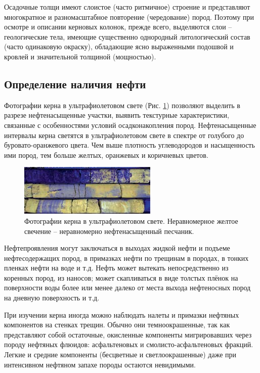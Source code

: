 \documentclass[14pt]{matmex-diploma}
\begin{document}
        Осадочные толщи имеют слоистое (часто ритмичное) строение и представляют многократное и разномасштабное повторение (чередование) пород. Поэтому при осмотре и описании керновых колонок, прежде всего, выделяются слои – геологические тела, имеющие существенно однородный литологический состав (часто одинаковую окраску), обладающие ясно выраженными подошвой и кровлей и значительной толщиной (мощностью).
        
    \subsection*{Определение наличия нефти}
    
        Фотографии керна в ультрафиолетовом свете (Рис. \ref{UV}) позволяют выделить в разрезе нефтенасыщенные участки, выявить текстурные характеристики, связанные с особенностями условий осадконакопления пород. Нефтенасыщенные интервалы керна светятся в ультрафиолетовом свете в спектре от голубого до буровато-оранжевого цвета. Чем выше плотность углеводородов и насыщенность ими пород, тем больше желтых, оранжевых и коричневых цветов. \cite{paper:kern}
        
        \begin{figure}[h]
            \centering
            \includegraphics[scale=1]{images/UV.png}
            \caption{Фотографии керна в ультрафиолетовом свете. Неравномерное желтое свечение – неравномерно нефтенасыщенный песчаник.}
            \label{UV}
        \end{figure}        
        
        Нефтепроявления могут заключаться в выходах жидкой нефти и подъеме нефтесодержащих пород, в примазках нефти по трещинам в породах, в тонких пленках нефти на воде и т.д. Нефть может вытекать непосредственно из коренных пород, из наносов; может скапливаться в виде толстых плёнок на поверхности воды более или менее далеко от места выхода нефтеносных пород на дневную поверхность и т.д.
        
        При изучении керна иногда можно наблюдать налеты и примазки нефтяных компонентов на стенках трещин. Обычно они темноокрашенные, так как представляют собой остаточные, окисленные компоненты мигрировавших через породу нефтяных флюидов: асфальтеновых и смолисто-асфальтеновых фракций. Легкие и средние компоненты (бесцветные и светлоокрашенные) даже при интенсивном нефтяном запахе породы остаются невидимыми.
        
\end{document}
